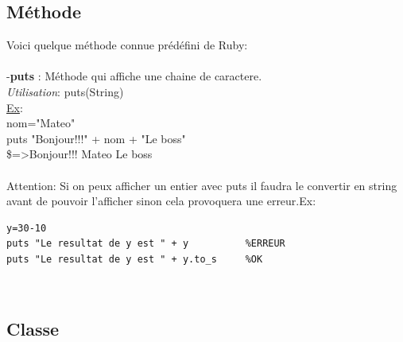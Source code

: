 \documentclass[a4paper,12pt,openany]{book}
\begin{document}

\subsection{Méthode}

Voici quelque méthode connue prédéfini de Ruby:\\
\\
-\textbf{puts} : Méthode qui affiche une chaine de caractere.\\
\emph{Utilisation}: puts(String)\\
\underline{Ex}:\\
nom="Mateo"\\
puts "Bonjour!!!" + nom + "Le boss"\\
\$=>Bonjour!!! Mateo Le boss\\
\\
Attention: Si on peux afficher un entier avec puts il faudra le convertir en string avant de pouvoir l'afficher sinon cela provoquera une erreur.Ex:\\
\begin{verbatim}
y=30-10
puts "Le resultat de y est " + y          %ERREUR
puts "Le resultat de y est " + y.to_s     %OK
\end{verbatim}
\\

\subsection{Classe}
\end{document}
